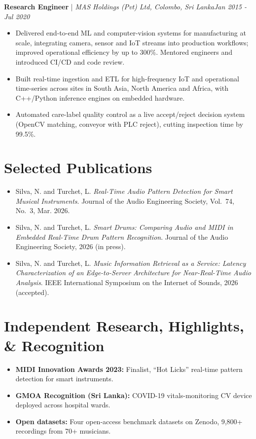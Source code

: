 \documentclass[11pt]{article}
\newenvironment{cvrole}[5]{%
  \par\noindent\textbf{\large #1} | \textit{\small #2, #3}\hfill \textit{\small #4 - #5}\par
  \begin{itemize}[leftmargin=2em, itemsep=-0.3em, topsep=-0.5em]%
}{%
  \end{itemize}\par\noindent\mbox{}\par\vspace{0.1em}%
}
\begin{document}
\begin{cvrole}{Research Engineer}{MAS Holdings (Pvt) Ltd}{Colombo, Sri Lanka}{Jan 2015}{Jul 2020}
    \item Delivered end-to-end ML and computer-vision systems for manufacturing at scale, integrating camera, sensor and IoT streams into production workflows; improved operational efficiency by up to 300\%. Mentored engineers and introduced CI/CD and code review.
    \item Built real-time ingestion and ETL for high-frequency IoT and operational time-series across sites in South Asia, North America and Africa, with C++/Python inference engines on embedded hardware.
    \item Automated care-label quality control as a live accept/reject decision system (OpenCV matching, conveyor with PLC reject), cutting inspection time by 99.5\%.
\end{cvrole}

\section*{Selected Publications \footnotesize {}}
\begin{itemize}[leftmargin=1.2em, itemsep=-0.25em]
    \item Silva, N. and Turchet, L. \textit{Real-Time Audio Pattern Detection for Smart Musical Instruments}. Journal of the Audio Engineering Society, Vol.~74, No.~3, Mar. 2026.
    \item Silva, N. and Turchet, L. \textit{Smart Drums: Comparing Audio and MIDI in Embedded Real-Time Drum Pattern Recognition}. Journal of the Audio Engineering Society, 2026 (in press).
    \item Silva, N. and Turchet, L. \textit{Music Information Retrieval as a Service: Latency Characterization of an Edge-to-Server Architecture for Near-Real-Time Audio Analysis}. IEEE International Symposium on the Internet of Sounds, 2026 (accepted).
\end{itemize}

\section*{Independent Research, Highlights, \& Recognition}
\begin{itemize}[leftmargin=1.2em, itemsep=-0.25em]
    \item \textbf{MIDI Innovation Awards 2023:} Finalist, ``Hot Licks'' real-time pattern detection for smart instruments.
    \item \textbf{GMOA Recognition (Sri Lanka):} COVID-19 vitals-monitoring CV device deployed across hospital wards.
    \item \textbf{Open datasets:} Four open-access benchmark datasets on Zenodo, 9,800+ recordings from 70+ musicians.
\end{itemize}
\end{document}
